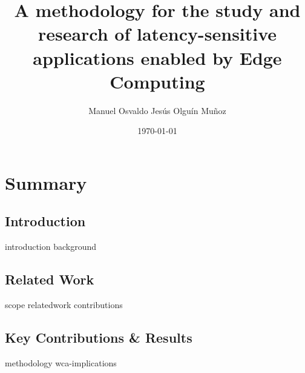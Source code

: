 \documentclass[electronic,oldfontcommands]{kthesis}
\begin{document}
\title{A methodology for the study and research of latency-sensitive applications enabled by Edge Computing}
\subtitle{{}}
\author{Manuel {Osvaldo Jesús} {Olguín Muñoz}}
\date{\today}
\address{%
	KTH Royal Institute of Technology\\%
	School of Electrical Engineering and Computer Science\\%
	Division of Information Science and Engineering\\%
	SE-10044 Stockholm\\%
	Sweden%
}

\maketitle

\frontmatter %





\mainmatter %

\tableofcontents%

\part{Summary}\label{part:summary}
\chapter{Introduction}\label{chap:introduction}
{introduction}
{background}

\chapter{Related Work}\label{chap:relwork}
{scope}
{relatedwork}
{contributions}

\chapter{Key Contributions \& Results}\label{chap:contributions}
{methodology}
{wca-implications}
\end{document}
